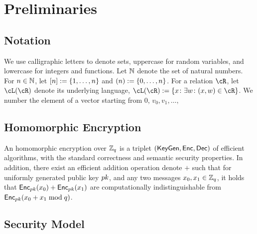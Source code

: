 \section{Preliminaries}\label{sec:Preliminaries}

\subsection{Notation} 
We use calligraphic letters to denote sets, uppercase for random variables, and lowercase for integers and functions. %
Let ${\mathbb{N}}$ denote the set of natural numbers.  For $n\in {\mathbb{N}}$, let $[n] \eqdef \set{1,\ldots,n}$ and $(n) \eqdef \set{0,\ldots,n}$.  For a relation $\cR$, let $\cL(\cR)$ denote its underlying language, \ie  $\cL(\cR) \eqdef \set{x\colon \exists w \colon (x,w) \in \cR}$.    We number the element of a vector starting from $0$, \ie $v_0,v_1,
\ldots,$


\subsection{Homomorphic Encryption}

An homomorphic encryption over ${\mathbb Z}_q$ is a triplet $(\mathsf{KeyGen},\mathsf{Enc},\mathsf{Dec})$ of efficient algorithms, with the standard correctness and semantic security properties.  In addition, there exist an efficient  addition operation denote $+$  such that for uniformly  generated public key  ${pk}$, and any two  messages $x_0,x_1\in {\mathbb Z}_q$,  it holds that  $\mathsf{Enc}_{pk}(x_0) + \mathsf{Enc}_{pk}(x_1) $ are computationally indistinguishable from $\mathsf{Enc}_{pk}(x_0+ x_1 \bmod q)$.


\subsection{Security Model}




